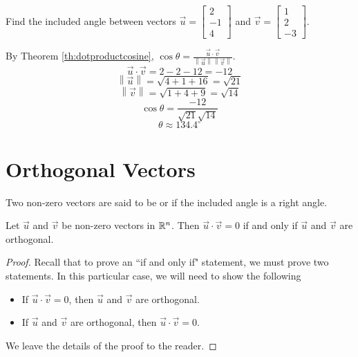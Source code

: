 \documentclass{ximera}
\newcommand\norm[1]{\left\lVert#1\right\rVert}
\begin{document}
\begin{example}\label{ex:anglebetweenvectors}
Find the included angle between vectors $\vec{u}=\begin{bmatrix}2\\-1\\4\end{bmatrix}$ and $\vec{v}=\begin{bmatrix}1\\2\\-3\end{bmatrix}$.

\begin{explanation}
By Theorem \ref{th:dotproductcosine}, $\cos \theta=\frac{\vec{u}\cdot \vec{v}}{\norm{\vec{u}}\norm{\vec{v}}}$.  
$$\vec{u}\cdot\vec{v}=2-2-12=-12$$
$$\norm{\vec{u}}=\sqrt{4+1+16}=\sqrt{21}$$
$$\norm{\vec{v}}=\sqrt{1+4+9}=\sqrt{14}$$
$$\cos\theta =\frac{-12}{\sqrt{21}\sqrt{14}}$$
$$\theta \approx 134.4^{\circ}  $$
\end{explanation}
\end{example}

\section*{Orthogonal Vectors}

Two non-zero vectors are said to be  or  if the included angle is a right angle.


  \begin{theorem}\label{th:orth} Let $\vec{u}$ and $\vec{v}$ be non-zero vectors in $\mathbb{R}^n$. Then $\vec{u}\cdot \vec{v}=0$ if and only if $\vec{u}$ and $\vec{v}$ are orthogonal.
\end{theorem}


\begin{proof} Recall that to prove an ``if and only if" statement, we must prove two statements.  In this particular case, we will need to show the following
\begin{itemize}
\item If $\vec{u}\cdot \vec{v}=0$, then $\vec{u}$ and $\vec{v}$ are orthogonal.
\item If $\vec{u}$ and $\vec{v}$ are orthogonal, then $\vec{u}\cdot \vec{v}=0$.
\end{itemize}
We leave the details of the proof to the reader.
\end{proof}
\end{document}
